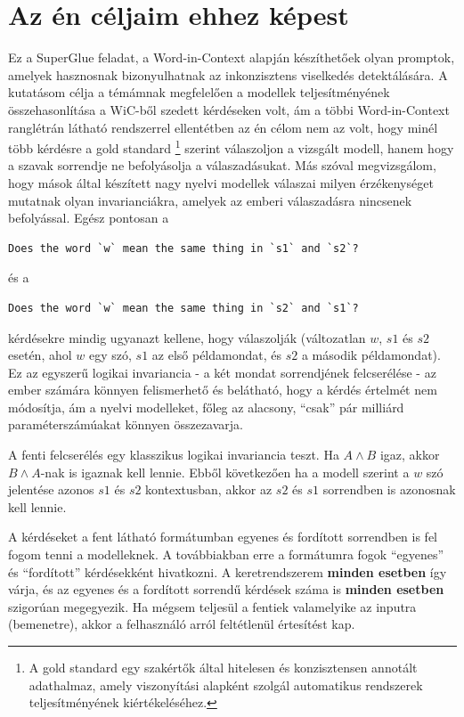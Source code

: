 \documentclass[12pt]{report}
\begin{document}
    \section{Az én céljaim ehhez képest}
    Ez a SuperGlue feladat, a Word-in-Context alapján készíthetőek olyan promptok, amelyek hasznosnak bizonyulhatnak az inkonzisztens viselkedés detektálására.
    A kutatásom célja a témámnak megfelelően a modellek teljesítményének összehasonlítása a WiC-ből szedett kérdéseken volt, ám a többi Word-in-Context ranglétrán látható rendszerrel ellentétben az én célom nem az volt, hogy minél több kérdésre a gold standard \footnote{A gold standard egy szakértők által hitelesen és konzisztensen annotált adathalmaz, amely viszonyítási alapként szolgál automatikus rendszerek teljesítményének kiértékeléséhez.} szerint válaszoljon a vizsgált modell, hanem hogy a szavak sorrendje ne befolyásolja a válaszadásukat.
    Más szóval megvizsgálom, hogy mások által készített nagy nyelvi modellek válaszai milyen érzékenységet mutatnak olyan invarianciákra, amelyek az emberi válaszadásra nincsenek befolyással.
    Egész pontosan a
    \begin{verbatim}
Does the word `w` mean the same thing in `s1` and `s2`?
    \end{verbatim}
    és a
    \begin{verbatim}
Does the word `w` mean the same thing in `s2` and `s1`?
    \end{verbatim}

    kérdésekre mindig ugyanazt kellene, hogy válaszolják (változatlan $w$, $s1$ és $s2$ esetén, ahol $w$ egy szó, $s1$ az első példamondat, és $s2$ a második példamondat).
    Ez az egyszerű logikai invariancia - a két mondat sorrendjének felcserélése - az ember számára könnyen felismerhető és belátható, hogy a kérdés értelmét nem módosítja, ám a nyelvi modelleket, főleg az alacsony, ``csak'' pár milliárd paraméterszámúakat könnyen összezavarja.

    A fenti felcserélés egy klasszikus logikai invariancia teszt. Ha $A \land B$ igaz, akkor $B \land A$-nak is igaznak kell lennie. Ebből következően ha a modell szerint a $w$ szó jelentése azonos $s1$ és $s2$ kontextusban, akkor az $s2$ és $s1$ sorrendben is azonosnak kell lennie.

    A kérdéseket a fent látható formátumban egyenes és fordított sorrendben is fel fogom tenni a modelleknek.
    A továbbiakban erre a formátumra fogok ``egyenes'' és ``fordított'' kérdésekként hivatkozni.
    A keretrendszerem \textbf{minden esetben} így várja, és az egyenes és a fordított sorrendű kérdések száma is \textbf{minden esetben} szigorúan megegyezik.
    Ha mégsem teljesül a fentiek valamelyike az inputra (bemenetre), akkor a felhasználó arról feltétlenül értesítést kap.
\end{document}
